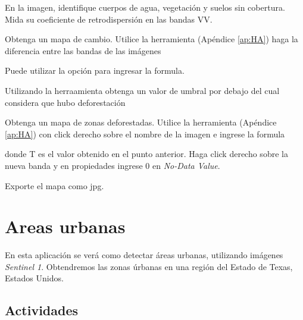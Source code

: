 \begin{que}
    En la imagen, identifique cuerpos de agua, vegetación y suelos sin cobertura. Mida su coeficiente de retrodispersión en las bandas VV.
\end{que}

\begin{que}
    Obtenga un mapa de cambio. Utilice la herramienta  (Apéndice \ref{ap:HA}) haga la diferencia entre las bandas de las imágenes
    \begin{center}
    \end{center}
    Puede utilizar la opción  para ingresar la formula.
\end{que}


\begin{que}
    Utilizando la herraamienta  obtenga un valor de umbral por debajo del cual considera que hubo deforestación
\end{que}

\begin{que}
    Obtenga un mapa de zonas deforestadas. Utilice la herramienta  (Apéndice \ref{ap:HA}) con click derecho sobre el nombre de la imagen e ingrese la formula
    \begin{center}
    \end{center}
    donde T es el valor obtenido en el punto anterior. Haga click derecho sobre la nueva banda y en propiedades ingrese 0 en \emph{No-Data Value}.
\end{que}

\begin{que}
    Exporte el mapa como jpg.
\end{que}


\section{Areas urbanas}

En esta aplicación se verá como detectar áreas urbanas, utilizando imágenes \emph{Sentinel 1}. Obtendremos las zonas úrbanas en una región del Estado de Texas, Estados Unidos.


\subsection{Actividades}

